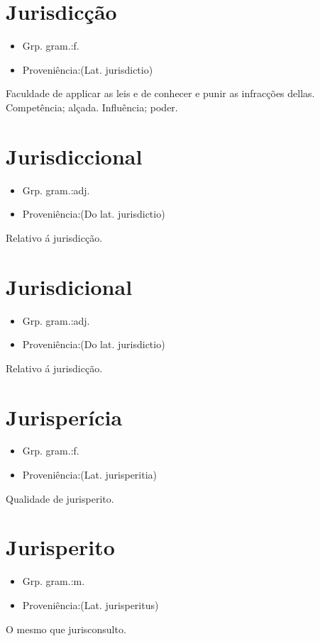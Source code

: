 \documentclass{article}
\begin{document}
\section{Jurisdicção}
\begin{itemize}
\item {Grp. gram.:f.}
\end{itemize}
\begin{itemize}
\item {Proveniência:(Lat. \textunderscore jurisdictio\textunderscore )}
\end{itemize}
Faculdade de applicar as leis e de conhecer e punir as infracções dellas.
Competência; alçada.
Influência; poder.
\section{Jurisdiccional}
\begin{itemize}
\item {Grp. gram.:adj.}
\end{itemize}
\begin{itemize}
\item {Proveniência:(Do lat. \textunderscore jurisdictio\textunderscore )}
\end{itemize}
Relativo á jurisdicção.
\section{Jurisdicional}
\begin{itemize}
\item {Grp. gram.:adj.}
\end{itemize}
\begin{itemize}
\item {Proveniência:(Do lat. \textunderscore jurisdictio\textunderscore )}
\end{itemize}
Relativo á jurisdicção.
\section{Jurisperícia}
\begin{itemize}
\item {Grp. gram.:f.}
\end{itemize}
\begin{itemize}
\item {Proveniência:(Lat. \textunderscore jurisperitia\textunderscore )}
\end{itemize}
Qualidade de jurisperito.
\section{Jurisperito}
\begin{itemize}
\item {Grp. gram.:m.}
\end{itemize}
\begin{itemize}
\item {Proveniência:(Lat. \textunderscore jurisperitus\textunderscore )}
\end{itemize}
O mesmo que \textunderscore jurisconsulto\textunderscore .
\end{document}
